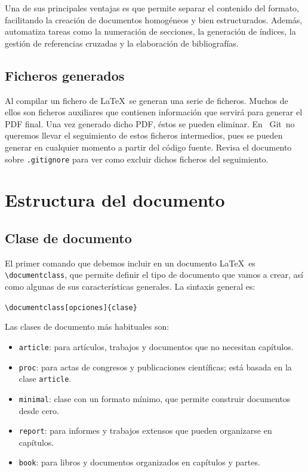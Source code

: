 \documentclass[11pt,a4paper]{article}
\theoremstyle{exercise}
\newcommand{\Git}{\textcolor{git}{\faIcon{git-alt}}~\!Git}
\begin{document}
Una de sus principales ventajas es que permite separar el contenido del formato, facilitando la creación de documentos homogéneos y bien estructurados. Además, automatiza tareas como la numeración de secciones, la generación de índices, la gestión de referencias cruzadas y la elaboración de bibliografías.



\subsection{Ficheros generados}

Al compilar un fichero de \LaTeX\ se generan una serie de ficheros.  Muchos de ellos son ficheros auxiliares que contienen información que servirá para generar el PDF final. Una vez generado dicho PDF, éstos se pueden eliminar. En \Git\ no queremos llevar el seguimiento de estos ficheros intermedios, pues se pueden generar en cualquier momento a partir del código fuente. Revisa el documento sobre \texttt{.gitignore} para ver como excluir dichos ficheros del seguimiento.







\section{Estructura del documento}

\subsection{Clase de documento}\label{sec:documento}

El primer comando que debemos incluir en un documento \LaTeX\ es
\verb|\documentclass|, que permite definir el tipo de documento
que vamos a crear, así como algunas de sus características
generales. La sintaxis general es:

\begin{center}
    \verb|\documentclass[opciones]{clase}|
\end{center}

Las clases de documento más habituales son:

\begin{itemize}
    \item \verb|article|: para artículos, trabajos y documentos
    que no necesitan capítulos.
    \item \verb|proc|: para actas de congresos y publicaciones
    científicas; está basada en la clase \verb|article|.
    \item \verb|minimal|: clase con un formato mínimo, que permite
    construir documentos desde cero.
    \item \verb|report|: para informes y trabajos extensos que
    pueden organizarse en capítulos.
    \item \verb|book|: para libros y documentos organizados en
    capítulos y partes.
\end{itemize}
\end{document}
